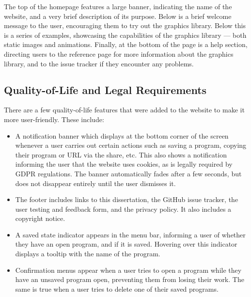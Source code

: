 \documentclass[../main.tex]{subfiles}
\begin{document}
            The top of the homepage features a large banner, indicating the name of the
                website, and a very brief description of its purpose.
            Below is a brief welcome message to the user, encouraging them to try out the
                graphics library.
            Below this is a series of examples, showcasing the capabilities of the graphics
                library — both static images and animations.
            Finally, at the bottom of the page is a help section, directing users to the
                reference page for more information about the graphics library, and to the
                issue tracker if they encounter any problems.

        \subsection{Quality-of-Life and Legal Requirements}
            There are a few quality-of-life features that were added to the website to make
                it more user-friendly.
            These include:
            \begin{itemize}
                \item A notification banner which displays at the bottom corner of the screen
                      whenever a user carries out certain actions such as saving a program, copying
                      their program or URL via the share, etc.
                      This also shows a notification informing the user that the website uses
                          cookies, as is legally required by GDPR regulations.
                      The banner automatically fades after a few seconds, but does not disappear
                          entirely until the user dismisses it.
                \item The footer includes links to this dissertation, the GitHub issue tracker,
                      the user testing and feedback form, and the privacy policy.
                      It also includes a copyright notice.
                \item A saved state indicator appears in the menu bar, informing a user of whether
                      they have an open program, and if it is saved.
                      Hovering over this indicator displays a tooltip with the name of the program.
                \item Confirmation menus appear when a user tries to open a program while they
                      have an unsaved program open, preventing them from losing their work.
                      The same is true when a user tries to delete one of their saved programs.
            \end{itemize}
\end{document}
